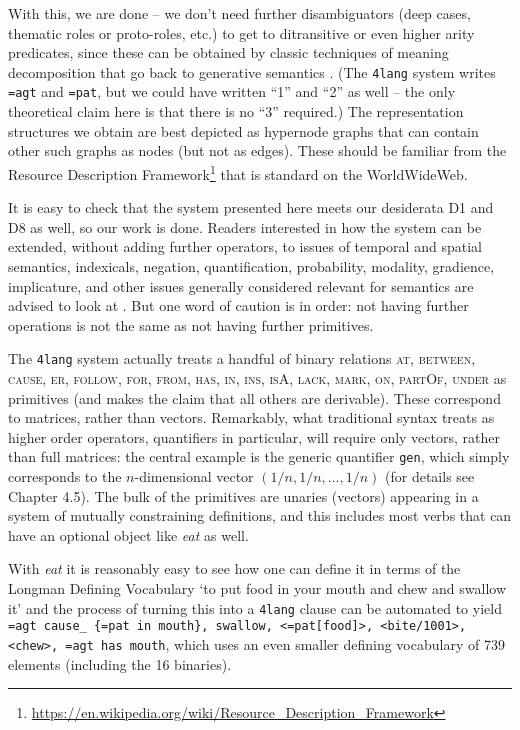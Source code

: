 \documentclass[output=paper,colorlinks=true,citecolor=brown]{langscibook}
\begin{document}
With this, we are done -- we don't need further disambiguators (deep cases,
thematic roles or proto-roles, etc.) to get to ditransitive or even higher
arity predicates, since these can be obtained by classic techniques of meaning
decomposition that go back to generative semantics \citep{Kornai:2012}.  (The
\texttt{4lang} system writes \texttt{=agt} and \texttt{=pat}, but we could have
written ``1'' and ``2'' as well -- the only theoretical claim here is that there
is no ``3'' required.) The representation structures we obtain are best depicted
as hypernode graphs that can contain other such graphs as nodes (but not as
edges). These should be familiar from the Resource Description Framework\footnote{\url{https://en.wikipedia.org/wiki/Resource_Description_Framework}} that is standard on the WorldWideWeb.

It is easy to check that the system presented here meets our
desiderata D1 and D8 as well, so our work is done. Readers interested in how the
system can be extended, without adding further operators, to issues of
temporal and spatial semantics, indexicals, negation, quantification,
probability, modality, gradience, implicature, and other issues generally
considered relevant for semantics are advised to look at
\citet{Kornai:2022}. But one word of caution is in order: not having further
operations is not the same as not having further primitives.

The \texttt{4lang} system actually treats a handful of binary relations \textsc{at, between, cause, er, follow, for, from, has, in, ins, isA, lack, mark, on, partOf, under} as primitives (and makes the claim that all others are
derivable). These correspond to matrices, rather than vectors. Remarkably,
what traditional syntax treats as higher order operators, quantifiers in
particular, will require only vectors, rather than full matrices: the central
example is the generic quantifier \texttt{gen}, which simply corresponds to the
$n$-dimensional vector $(1/n,1/n,...,1/n)$ (for details see
\citet{Kornai:2022} Chapter 4.5). The bulk of the primitives are unaries (vectors)
appearing in a system of mutually constraining definitions, and this includes
most verbs that can have an optional object like \textit{eat} as well.

With \textit{eat} it is reasonably easy to see how one can define it in terms of
the Longman Defining Vocabulary `to put food in your mouth and chew and
swallow it' and the process of turning this into a \texttt{4lang} clause can be
automated \citep{Recski:2016d} to yield \texttt{=agt cause\_ \{=pat in mouth\},
  swallow, <=pat[food]>, <bite/1001>, <chew>, =agt has mouth}, which uses an
even smaller defining vocabulary of 739 elements (including the 16 binaries).
\end{document}
